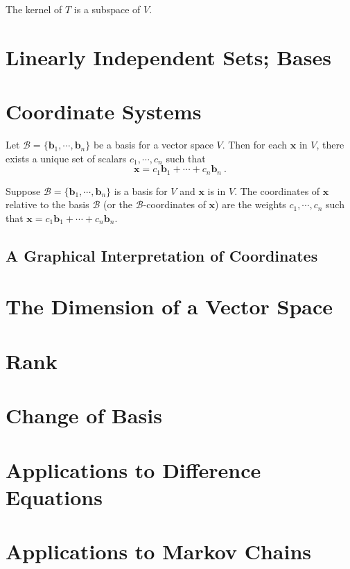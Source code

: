 \documentclass[12pt,a4paper]{article}
\renewcommand{\vec}[1]{\boldsymbol{#1}}
\begin{document}
The kernel of $T$ is a subspace of $V$.


\section{Linearly Independent Sets; Bases}







\section{Coordinate Systems}

\begin{tcolorbox}[colback=green!5,colframe=green!40!black,title= The Unique Representation Theorem]
Let $\mathcal B = \{\vec{b}_1, \cdots, \vec{b}_n\}$ be a basis for a vector space $V$. Then for each $\vec{x}$ in $V$, there exists a unique set of scalars $c_1, \cdots, c_n$ such that
\begin{equation}
\vec{x} = c_1 \vec{b}_1 + \cdots + c_n \vec{b}_n ~.
\end{equation}
\end{tcolorbox}

\begin{tcolorbox}[colback=green!5,colframe=green!40!black,title= Definition]
Suppose $\mathcal B = \{\vec{b}_1, \cdots, \vec{b}_n\}$ is a basis for $V$ and $\vec{x}$ is in $V$. The coordinates of $\vec{x}$
relative to the basis $\mathcal B$ (or the  $\mathcal B$-coordinates of $\vec{x}$) are the weights $c_1, \cdots, c_n$
such that $\vec{x} = c_1 \vec{b}_1 + \cdots + c_n \vec{b}_n$.
\end{tcolorbox}


\subsection{A Graphical Interpretation of Coordinates}





\section{The Dimension of a Vector Space}



\section{Rank}



\section{Change of Basis}


\section{Applications to Difference Equations}



\section{Applications to Markov Chains}
\end{document}
